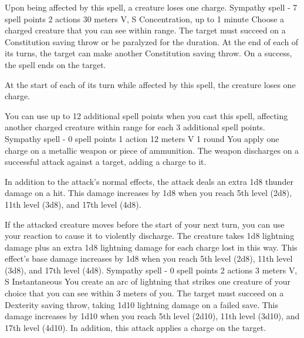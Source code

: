         Upon being affected by this spell, a creature loses one charge.
        {Sympathy spell - 7 spell points}
        {2 actions}
        {30 meters}
        {V, S}
        {Concentration, up to 1 minute}
        Choose a charged creature that you can see within range.
        The target must succeed on a Constitution saving throw or be paralyzed for the duration.
        At the end of each of its turns, the target can make another Constitution saving throw.
        On a success, the spell ends on the target.

        At the start of each of its turn while affected by this spell, the creature loses one charge.

        You can use up to 12 additional spell points when you cast this spell, affecting another charged creature within range for each 3 additional spell points.
        {Sympathy spell - 0 spell points}
        {1 action}
        {12 meters}
        {V}
        {1 round}
        You apply one charge on a metallic weapon or piece of ammunition.
        The weapon discharges on a successful attack against a target, adding a charge to it.

        In addition to the attack's normal effects, the attack deals an extra 1d8 thunder damage on a hit.
        This damage increases by 1d8 when you reach 5th level (2d8), 11th level (3d8), and 17th level (4d8).

        If the attacked creature moves before the start of your next turn, you can use your reaction to cause it to violently discharge.
        The creature takes 1d8 lightning damage plus an extra 1d8 lightning damage for each charge lost in this way.
        This effect's base damage increases by 1d8 when you reach 5th level (2d8), 11th level (3d8), and 17th level (4d8).
        {Sympathy spell - 0 spell points}
        {2 actions}
        {3 meters}
        {V, S}
        {Instantaneous}
        You create an arc of lightning that strikes one creature of your choice that you can see within 3 meters of you.
        The target must succeed on a Dexterity saving throw, taking 1d10 lightning damage on a failed save.
        This damage increases by 1d10 when you reach 5th level (2d10), 11th level (3d10), and 17th level (4d10).
        In addition, this attack applies a charge on the target.

